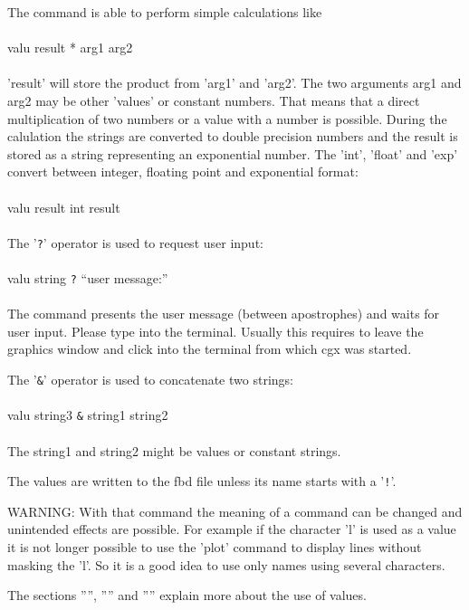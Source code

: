 \documentclass{article}
\begin{document}
The command is able to perform simple calculations like\\\\valu result * arg1 arg2\\\\'result' will store the product from 'arg1' and 'arg2'. The two arguments arg1 and arg2 may be other 'values' or constant numbers. That means that a direct multiplication of two numbers or a value with a number is possible. During the calulation the strings are converted to double precision numbers and the result is stored as a string representing an exponential number. The 'int', 'float' and 'exp' convert between integer, floating point and exponential format:\\\\valu result int result\\\\

The '\verb_?_' operator is used to request user input:\\\\valu string \verb_?_ ``user message:''\\\\The command presents the user message (between apostrophes) and waits for user input. Please type into the terminal. Usually this requires to leave the graphics window and click into the terminal from which cgx was started.

The '\verb_&_' operator is used to concatenate two strings:\\\\valu string3 \verb_&_ string1 string2\\\\The string1 and string2 might be values or constant strings.

The values are written to the fbd file unless its name starts with a '\verb_!_'. 

WARNING: With that command the meaning of a command can be changed and unintended effects are possible. For example if the character 'l' is used as a value it is not longer possible to use the 'plot' command to display lines without masking the 'l'. So it is a good idea to use only names using several characters.

The sections '''', '''' and '''' explain more about the use of values.
\end{document}
